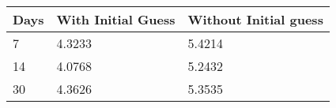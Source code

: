 \begin{tabular}{lll}
Days & With Initial Guess & Without Initial guess \\ 
\hline 
7 & 4.3233 & 5.4214 \\ 
14 & 4.0768 & 5.2432 \\ 
30 & 4.3626 & 5.3535 \\ 
\hline 
\end{tabular}
